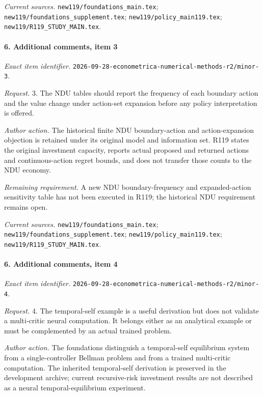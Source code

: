 \par\emph{Current sources.} \nolinkurl{new119/foundations_main.tex}; \nolinkurl{new119/foundations_supplement.tex}; \nolinkurl{new119/policy_main119.tex}; \nolinkurl{new119/R119_STUDY_MAIN.tex}.

\paragraph{6. Additional comments, item 3}

\emph{Exact item identifier.} \nolinkurl{2026-09-28-econometrica-numerical-methods-r2/minor-3}.

\par\emph{Request.} 3. The NDU tables should report the frequency of each boundary action and the value change under action-set expansion before any policy interpretation is offered.

\par\emph{Author action.} The historical finite NDU boundary-action and action-expansion objection is retained under its original model and information set. R119 states the original investment capacity, reports actual proposed and returned actions and continuous-action regret bounds, and does not transfer those counts to the NDU economy.

\par\emph{Remaining requirement.} A new NDU boundary-frequency and expanded-action sensitivity table has not been executed in R119; the historical NDU requirement remains open.

\par\emph{Current sources.} \nolinkurl{new119/foundations_main.tex}; \nolinkurl{new119/foundations_supplement.tex}; \nolinkurl{new119/policy_main119.tex}; \nolinkurl{new119/R119_STUDY_MAIN.tex}.

\paragraph{6. Additional comments, item 4}

\emph{Exact item identifier.} \nolinkurl{2026-09-28-econometrica-numerical-methods-r2/minor-4}.

\par\emph{Request.} 4. The temporal-self example is a useful derivation but does not validate a multi-critic neural computation. It belongs either as an analytical example or must be complemented by an actual trained problem.

\par\emph{Author action.} The foundations distinguish a temporal-self equilibrium system from a single-controller Bellman problem and from a trained multi-critic computation. The inherited temporal-self derivation is preserved in the development archive; current recursive-risk investment results are not described as a neural temporal-equilibrium experiment.

